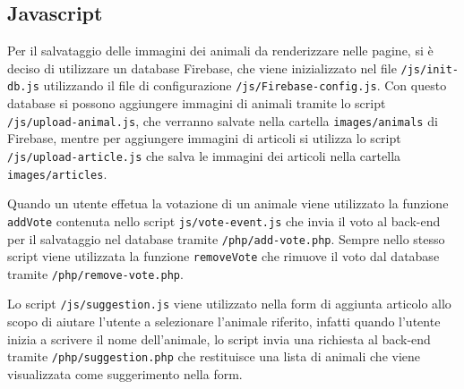 \subsection{Javascript}
Per il salvataggio delle immagini dei animali da renderizzare nelle pagine, si è deciso di utilizzare un database Firebase, che viene inizializzato nel file \texttt{/js/init-db.js} utilizzando il file di configurazione \texttt{/js/Firebase-config.js}. 
Con questo database si possono aggiungere immagini di animali tramite lo script \texttt{/js/upload-animal.js}, che verranno salvate nella cartella \texttt{images/animals} di Firebase, mentre per aggiungere immagini di articoli 
si utilizza lo script \texttt{/js/upload-article.js} che salva le immagini dei articoli nella cartella \texttt{images/articles}.

Quando un utente effetua la votazione di un animale viene utilizzato la funzione \texttt{addVote} contenuta nello script \texttt{js/vote-event.js} che invia il voto al back-end per il salvataggio nel database tramite \texttt{/php/add-vote.php}.
Sempre nello stesso script viene utilizzata la funzione \texttt{removeVote} che rimuove il voto dal database tramite \texttt{/php/remove-vote.php}.

Lo script \texttt{/js/suggestion.js} viene utilizzato nella form di aggiunta articolo allo scopo di aiutare l'utente a selezionare l'animale riferito,
infatti quando l'utente inizia a scrivere il nome dell'animale, lo script invia una richiesta al back-end tramite \texttt{/php/suggestion.php} che restituisce una lista di animali che viene visualizzata come suggerimento nella form.

